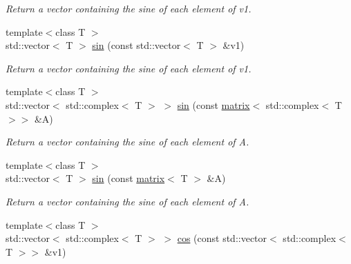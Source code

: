 \begin{DoxyCompactItemize}
\begin{DoxyCompactList}\small\item\em Return a vector containing the sine of each element of v1. \end{DoxyCompactList}\item 
\hypertarget{namespacekeycpp_a56636d37802b9237f0e09690307cacef}{{\footnotesize template$<$class T $>$ }\\std\-::vector$<$ T $>$ \hyperlink{namespacekeycpp_a56636d37802b9237f0e09690307cacef}{sin} (const std\-::vector$<$ T $>$ \&v1)}\label{namespacekeycpp_a56636d37802b9237f0e09690307cacef}

\begin{DoxyCompactList}\small\item\em Return a vector containing the sine of each element of v1. \end{DoxyCompactList}\item 
\hypertarget{namespacekeycpp_a7d66a7287374d8e1e685538e0363101e}{{\footnotesize template$<$class T $>$ }\\std\-::vector$<$ std\-::complex$<$ T $>$ $>$ \hyperlink{namespacekeycpp_a7d66a7287374d8e1e685538e0363101e}{sin} (const \hyperlink{classkeycpp_1_1matrix}{matrix}$<$ std\-::complex$<$ T $>$$>$ \&A)}\label{namespacekeycpp_a7d66a7287374d8e1e685538e0363101e}

\begin{DoxyCompactList}\small\item\em Return a vector containing the sine of each element of A. \end{DoxyCompactList}\item 
\hypertarget{namespacekeycpp_a0dd3aac5066a4d3e2c7108b26c554605}{{\footnotesize template$<$class T $>$ }\\std\-::vector$<$ T $>$ \hyperlink{namespacekeycpp_a0dd3aac5066a4d3e2c7108b26c554605}{sin} (const \hyperlink{classkeycpp_1_1matrix}{matrix}$<$ T $>$ \&A)}\label{namespacekeycpp_a0dd3aac5066a4d3e2c7108b26c554605}

\begin{DoxyCompactList}\small\item\em Return a vector containing the sine of each element of A. \end{DoxyCompactList}\item 
\hypertarget{namespacekeycpp_a9b3d958e47ae678b0818a166d5a75883}{{\footnotesize template$<$class T $>$ }\\std\-::vector$<$ std\-::complex$<$ T $>$ $>$ \hyperlink{namespacekeycpp_a9b3d958e47ae678b0818a166d5a75883}{cos} (const std\-::vector$<$ std\-::complex$<$ T $>$$>$ \&v1)}\label{namespacekeycpp_a9b3d958e47ae678b0818a166d5a75883}


\end{DoxyCompactItemize}
